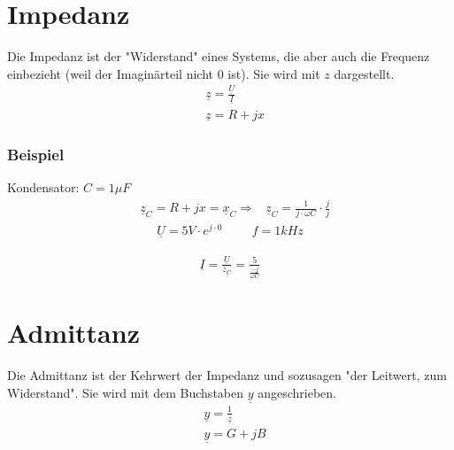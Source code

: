 \section{Impedanz}
Die Impedanz ist der "Widerstand" eines Systems, die aber auch die Frequenz einbezieht (weil der Imaginärteil nicht $0$ ist). Sie wird mit $z$ dargestellt.
\begin{align}
    &\underline{z}=\frac{\underline{U}}{\underline{I}} \\
    &\underline{z}=R+jx
\end{align}

\subsubsection*{Beispiel}
Kondensator: $C=1\mu F$\\
\begin{align}
    &\underline{z}_C=R+jx=\underline{x}_C \Rightarrow &\underline{z}_C=\frac{1}{j\cdot\omega C}\cdot\frac{j}{j}
\end{align}
\begin{align}
    \underline{U}=5V\cdot e^{j\cdot 0} \hspace{1cm} f=1kHz
\end{align}

\begin{align}
    \underline{I} = \frac{\underline{U}}{\underline{z_C}} = \frac{5}{\frac{-j}{\omega C}}
\end{align}

\section{Admittanz}
Die Admittanz ist der Kehrwert der Impedanz und sozusagen "der Leitwert, zum Widerstand". Sie wird mit dem Buchstaben $\underline{y}$ angeschrieben.
\begin{align}
    &\underline{y}=\frac{1}{\underline{z}}  \\
    &\underline{y}=G+jB
\end{align}